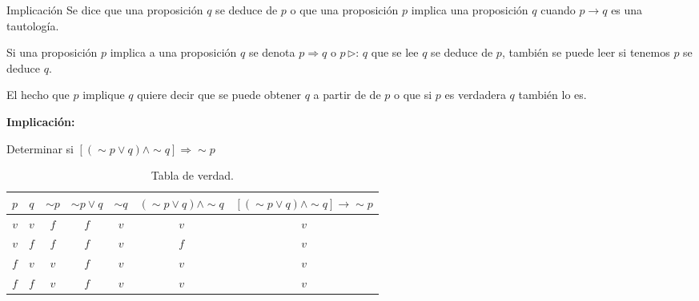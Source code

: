 \begin{defi}{Implicación}{} Se dice que una proposición $q$ se
deduce de $p$ o que una proposición $p$ implica una proposición
$q$ cuando $p\rightarrow q$ es una tautología.\end{defi}

\notacion  Si una proposición $p$ implica a una proposición $q$
se denota $p\Rightarrow q$ o $p\,\triangleright:\,q$ que se lee
$q$ se deduce de $p$, también se puede leer si tenemos $p$ se deduce
$q.$

\obs El hecho que $p$ implique $q$ quiere decir que se puede obtener
$q$ a partir de de $p$ o que si $p$ es verdadera $q$ también lo
es.

\begin{ejemplo}{\bf Implicación:}

Determinar si $\left[\left(\sim p\vee q\right)\wedge\sim q\right]\Rightarrow\sim p$
\end{ejemplo}

\solu 
\begin{table}[H]
\centering

\caption{Tabla de verdad.}

\begin{tabular}{c|c|c|c|c|c|c}
\arrayrulecolor{ptctitle}\cellcolor{ptctitle!50}$p$ &
\cellcolor{ptctitle!50}$q$ &
\cellcolor{ptctitle!50}$\sim p$ &
\cellcolor{ptctitle!50}$\sim p\vee q$ &
\cellcolor{ptctitle!50}$\sim q$ &
\cellcolor{ptctitle!50}\foreignlanguage{english}{$\left(\sim p\vee q\right)\wedge\sim q$} &
\cellcolor{ptctitle!50}$\left[\left(\sim p\vee q\right)\wedge\sim q\right]\rightarrow\sim p$ \tabularnewline
\hline 
\cellcolor{ptcbackground} $v$ &
\cellcolor{ptcbackground}$v$ &
\cellcolor{ptcbackground}$f$ &
\cellcolor{ptcbackground}$f$ &
\cellcolor{ptcbackground}$v$ &
\cellcolor{ptcbackground}$v$ &
\cellcolor{ptcbackground}$v$\tabularnewline
\hline 
\cellcolor{gray!50}$v$ &
\cellcolor{gray!50} $f$ &
\cellcolor{gray!50}$f$ &
\cellcolor{gray!50}$f$ &
\cellcolor{gray!50}$v$ &
\cellcolor{gray!50}$f$ &
\cellcolor{gray!50}$v$\tabularnewline
\hline 
\cellcolor{ptcbackground}$f$ &
\cellcolor{ptcbackground} $v$ &
\cellcolor{ptcbackground} $v$ &
\cellcolor{ptcbackground}$f$ &
\cellcolor{ptcbackground}$v$ &
\cellcolor{ptcbackground}$v$ &
\cellcolor{ptcbackground}$v$\tabularnewline
\hline 
\cellcolor{gray!50} $f$ &
\cellcolor{gray!50} $f$ &
\cellcolor{gray!50} $v$ &
\cellcolor{gray!50}$f$ &
\cellcolor{gray!50}$v$ &
\cellcolor{gray!50}$v$ &
\cellcolor{gray!50}$v$\tabularnewline
\hline 
\end{tabular}
\end{table}

